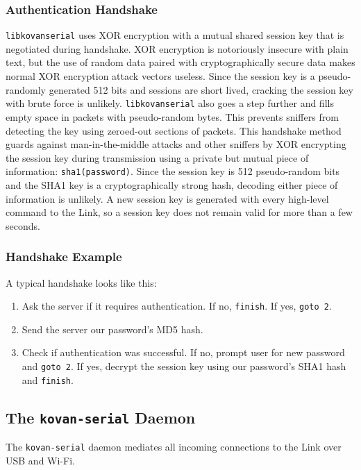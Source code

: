 \documentclass[12pt,letterpaper]{article}
\begin{document}
	\subsubsection{Authentication Handshake}
	\texttt{libkovanserial} uses XOR encryption with a mutual shared session key that is negotiated during handshake. XOR encryption
	is notoriously insecure with plain text, but the use of random data paired with cryptographically secure data makes normal XOR
	encryption attack vectors useless. Since the session key is a pseudo-randomly generated 512 bits and sessions are short lived,
	cracking the session key with brute force is unlikely. \texttt{libkovanserial} also goes a step further and fills empty space in
	packets with pseudo-random bytes. This prevents sniffers from detecting the key using zeroed-out sections of packets. This handshake
	method guards against man-in-the-middle attacks and other sniffers by XOR encrypting the session key during transmission using a private
	but mutual piece of information: \texttt{sha1(password)}. Since the session key is 512 pseudo-random bits and the SHA1 key is a cryptographically
	strong hash, decoding either piece of information is unlikely. A new session key is generated with every high-level command to the Link, so a
	session key does not remain valid for more than a few seconds.
	
	\subsubsection{Handshake Example}
	
	A typical handshake looks like this:
	\begin{enumerate}
		\setlength{\itemsep}{0em}
		\item Ask the server if it requires authentication. If no, \texttt{finish}. If yes, \texttt{goto 2}.
		\item Send the server our password's MD5 hash.
		\item Check if authentication was successful. If no, prompt user for new password and \texttt{goto 2}.
		If yes, decrypt the session key using our password's SHA1 hash and \texttt{finish}.
	\end{enumerate}
	
	
	\subsection{The \texttt{kovan-serial} Daemon}
	The \texttt{kovan-serial} daemon mediates all incoming connections to the Link over USB and Wi-Fi.
	
\end{document}
